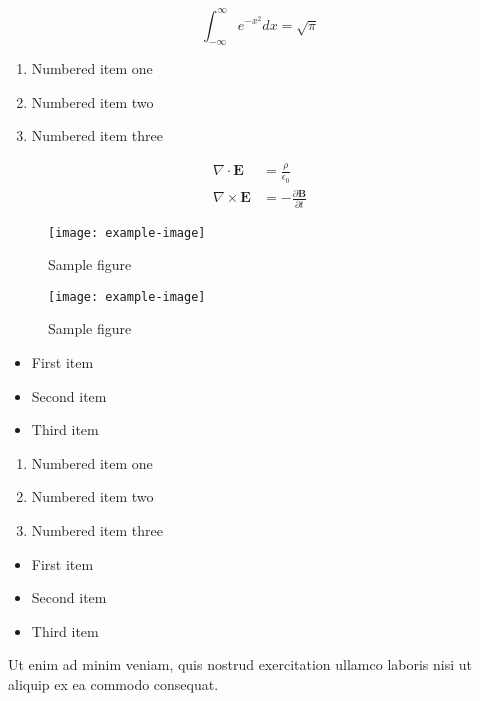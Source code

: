 \documentclass{article}
\begin{document}
\begin{equation}
    \int_{-\infty}^{\infty} e^{-x^2} dx = \sqrt{\pi}
\end{equation}

\begin{enumerate}
\item Numbered item one
\item Numbered item two
\item Numbered item three
\end{enumerate}


\begin{align}
    \nabla \cdot \mathbf{E} &= \frac{\rho}{\epsilon_0} \\
    \nabla \times \mathbf{E} &= -\frac{\partial \mathbf{B}}{\partial t}
\end{align}

\begin{figure}[h]
    \centering
    \texttt{[image: example-image]}
    \caption{Sample figure}
    \label{fig:sample}
\end{figure}

\begin{figure}[h]
    \centering
    \texttt{[image: example-image]}
    \caption{Sample figure}
    \label{fig:sample}
\end{figure}

\begin{itemize}
\item First item
\item Second item
\item Third item
\end{itemize}


\begin{enumerate}
\item Numbered item one
\item Numbered item two
\item Numbered item three
\end{enumerate}

\begin{itemize}
\item First item
\item Second item
\item Third item
\end{itemize}

Ut enim ad minim veniam, quis nostrud exercitation ullamco laboris nisi ut aliquip ex ea commodo consequat.
\end{document}
